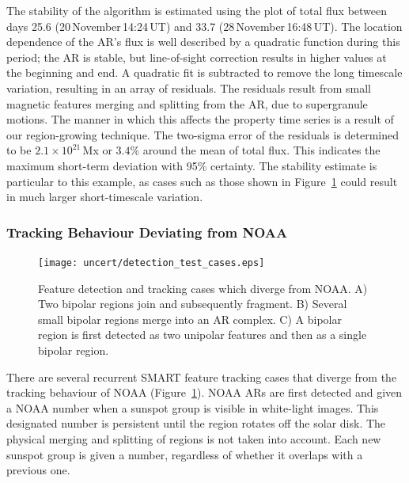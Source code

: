 The stability of the algorithm is estimated using the plot of total flux between days 25.6 (20\,November\,14:24\,UT) and 33.7 (28\,November\,16:48\,UT). The location dependence of the AR's flux is well described by a quadratic function during this period; the AR is stable, but line-of-sight correction results in higher values at the beginning and end. A quadratic fit is subtracted to remove the long timescale variation, resulting in an array of residuals. The residuals result from small magnetic features merging and splitting from the AR, due to supergranule motions. The manner in which this affects the property time series is a result of our region-growing technique. The two-sigma error of the residuals is determined to be $2.1\times10^{21}$\,Mx or $3.4\%$ around the mean of total flux. This indicates the maximum short-term deviation with 95\% certainty. The stability estimate is particular to this example, as cases such as those shown in Figure~\ref{detectcases} could result in much larger short-timescale variation.


\subsubsection{Tracking Behaviour Deviating from NOAA}\label{sect:nonnoaatrack}

\begin{figure}[!t]
\centerline{\texttt{[image: uncert/detection\_test\_cases.eps]}}
\caption[SMART detection and tracking divergent from NOAA.]{Feature detection and tracking cases which diverge from NOAA. A) Two bipolar regions join and subsequently fragment. B) Several small bipolar regions merge into an AR complex. C) A bipolar region is first detected as two unipolar features and then as a single bipolar region.}
\label{detectcases}
\end{figure}

There are several recurrent \gls{SMART} feature tracking cases that diverge from the tracking behaviour of NOAA (Figure~\ref{detectcases}). NOAA ARs are first detected and given a NOAA number when a sunspot group is visible in white-light images. This designated number is persistent until the region rotates off the solar disk. The physical merging and splitting of regions is not taken into account. Each new sunspot group is given a number, regardless of whether it overlaps with a previous one. 

